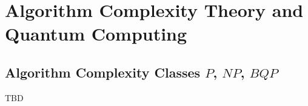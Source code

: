 \section{Algorithm Complexity Theory and Quantum Computing}

\subsection{Algorithm Complexity Classes $P$, $NP$, $BQP$ }

TBD
